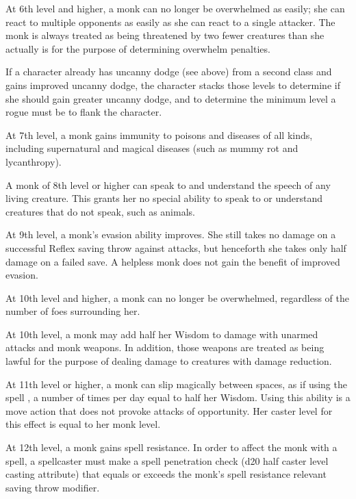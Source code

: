  At 6th level and higher, a monk can no longer be overwhelmed as easily; she can react to multiple opponents as easily as she can react to a single attacker. The monk is always treated as being threatened by two fewer creatures than she actually is for the purpose of determining overwhelm penalties.
\par If a character already has uncanny dodge (see above) from a
second class and gains improved uncanny dodge, the character stacks those levels to determine if she should gain greater uncanny dodge, and to determine the minimum level a rogue must be to flank the character.

 At 7th level, a monk gains immunity to poisons and diseases of all kinds, including supernatural and magical diseases (such as mummy rot and lycanthropy).

 A monk of 8th level or higher can speak to and understand the speech of any living creature. This grants her no special ability to speak to or understand creatures that do not speak, such as animals.

 At 9th level, a monk's evasion ability improves. She still takes no damage on a successful Reflex saving throw against attacks, but henceforth she takes only half damage on a failed save. A helpless monk does not gain the benefit of improved evasion.

 At 10th level and higher, a monk can no longer be overwhelmed, regardless of the number of foes surrounding her.

 At 10th level, a monk may add half her Wisdom to damage with unarmed attacks and monk weapons. In addition, those weapons are treated as being lawful for the purpose of dealing damage to creatures with damage reduction.

 At 11th level or higher, a monk can slip magically between spaces, as if using the spell , a number of times per day equal to half her Wisdom. Using this ability is a move action that does not provoke attacks of opportunity. Her caster level for this effect is equal to her monk level.

 At 12th level, a monk gains spell resistance. In order to affect the monk with a spell, a spellcaster must make a spell penetration check (d20 \add half caster level \add casting attribute) that equals or exceeds the monk's spell resistance \add relevant saving throw modifier.

